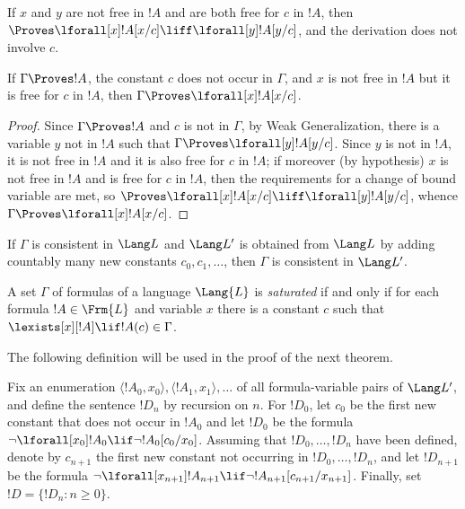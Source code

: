 \documentclass[../../include/open-logic-section]{subfiles}
\begin{document}

\begin{prop}
If $x$ and $y$ are not free in $!A$ and are both free for $c$ in $!A$,
then $\Proves \lforall[x] !A[x/c] \liff \lforall[y] !A[y/c]$, and the
derivation does not involve $c$.
\end{prop}

\begin{thm}
If $\Gamma \Proves !A$, the constant $c$ does not occur in $\Gamma$,
and $x$ is not free in $!A$ but it is free for $c$ in $!A$, then
$\Gamma \Proves \lforall[x] !A[x/c]$.
\end{thm}

\begin{proof}
Since $\Gamma \Proves !A$ and $c$ is not in $\Gamma$, by Weak
Generalization, there is a variable $y$ not in $!A$ such that $\Gamma
\Proves \lforall[y] !A [y/c]$.  Since $y$ is not in $!A$, it is not
free in $!A$ and it is also free for $c$ in $!A$; if moreover (by
hypothesis) $x$ is not free in $!A$ and is free for $c$ in $!A$, then
the requirements for a change of bound variable are met, so $\Proves
\lforall[x] !A[x/c] \liff \lforall[y] !A[y/c]$, whence $\Gamma \Proves
\lforall[x] !A[x/c]$.
\end{proof}

\begin{lem}
If $\Gamma$ is consistent in $\Lang L$ and $\Lang L'$ is obtained from
$\Lang L$ by adding countably many new constants $c_0, c_1, \dots$,
then $\Gamma$ is consistent in $\Lang L'$.
\end{lem}

\begin{defn}
  A set $\Gamma$ of formulas of a language $\Lang {L}$ is
  \emph{saturated} if and only if for each formula $!A \in
  \Frm {L}$ and variable $x$ there is a constant $c$ such that
  $\lexists[x][!A] \lif !A(c) \in \Gamma$.
\end{defn}


The following definition will be used in the proof of the next theorem.

\begin{defn}
Fix an enumeration $\langle !A_0, x_0 \rangle, \langle !A_1, x_1
\rangle, \dots$ of all formula-variable pairs of $\Lang L'$, and
define the sentence $!D_n$ by recursion on $n$. For $!D_0$,
let $c_0$ be the first new constant that does not occur in $!A_0$ and
let $!D_0$ be the formula $\lnot \lforall[x_0] !A_0 \lif \lnot
!A_0[c_0/x_0]$. Assuming that $!D_0, \dots, !D_n$ have been
defined, denote by $c_{n+1}$ the first new constant not occurring in
$!D_0, \dots, !D_n$, and let $!D_{n+1}$ be the formula
$\lnot \lforall[x_{n+1}] !A_{n+1} \lif \lnot
!A_{n+1}[c_{n+1}/x_{n+1}]$. Finally, set $!D = \{ !D_n : n
\geq 0 \}$.
\end{defn}
\end{document}
